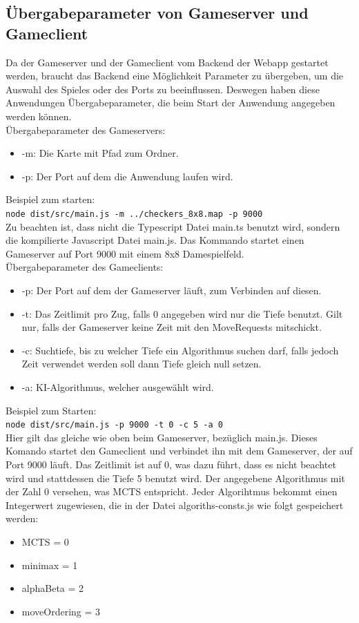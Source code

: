 \documentclass[12pt,a4paper,bibliography=totocnumbered,listof=totocnumbered]{article}
\begin{document}
\begin{appendix}
\pagebreak

\section{Übergabeparameter von Gameserver und Gameclient}
\label{apx:Parameters}
Da der Gameserver und der Gameclient vom Backend der Webapp gestartet werden, braucht das Backend eine Möglichkeit Parameter zu übergeben, 
um die Auswahl des Spieles oder des Ports zu beeinflussen. Deswegen haben diese Anwendungen Übergabeparameter, die beim Start der
Anwendung angegeben werden können. 
\\
Übergabeparameter des Gameservers:
\\
\begin{itemize}
    \item -m: Die Karte mit Pfad zum Ordner.
    \item -p: Der Port auf dem die Anwendung laufen wird.
\end{itemize}
Beispiel zum starten:\\
\texttt{node dist/src/main.js -m ../checkers\_8x8.map -p 9000}\\
Zu beachten ist, dass nicht die Typescript Datei main.ts benutzt wird, sondern die kompilierte Javascript Datei main.js.
Das Kommando startet einen Gameserver auf Port 9000 mit einem 8x8 Damespielfeld.
\\
Übergabeparameter des Gameclients:
\begin{itemize}
    \item -p: Der Port auf dem der Gameserver läuft, zum Verbinden auf diesen.
    \item -t: Das Zeitlimit pro Zug, falls 0 angegeben wird nur die Tiefe benutzt. Gilt nur, falls der Gameserver
    keine Zeit mit den MoveRequests mitschickt.
    \item -c: Suchtiefe, bis zu welcher Tiefe ein Algorithmus suchen darf, falls jedoch Zeit verwendet werden soll dann Tiefe gleich null setzen.
    \item -a: KI-Algorithmus, welcher ausgewählt wird.
\end{itemize}
Beispiel zum Starten:\\
\texttt{node dist/src/main.js -p 9000 -t 0 -c 5 -a 0} \\
Hier gilt das gleiche wie oben beim Gameserver, bezüglich main.js. 
Dieses Komando startet den Gameclient und verbindet ihn mit dem Gameserver, der auf Port 9000 läuft. Das Zeitlimit ist auf 0, was dazu führt, dass es nicht beachtet wird
und stattdessen die Tiefe 5 benutzt wird. Der angegebene Algorithmus mit der Zahl 0 versehen, was MCTS entspricht.
Jeder Algorihtmus bekommt einen Integerwert zugewiesen, die in der Datei algoriths-consts.js wie folgt gespeichert werden: \\
\begin{itemize}
    \item MCTS = 0
    \item minimax = 1
    \item alphaBeta = 2
    \item moveOrdering = 3
\end{itemize}


\end{appendix}
\end{document}
